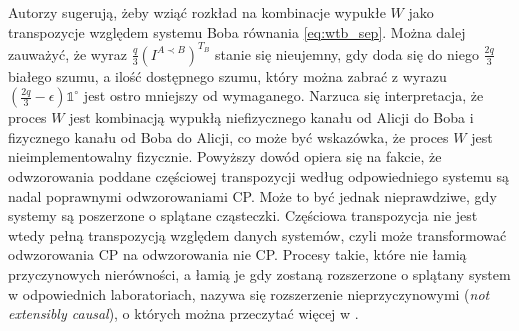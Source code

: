 \documentclass[10pt]{article} %
\newcommand{\IO}{\mathbb{1}^\circ}
\begin{document}
Autorzy \cite{causal_model} sugerują, żeby wziąć rozkład na kombinacje wypukłe $W$ jako transpozycje względem systemu Boba równania \eqref{eq:wtb_sep}. Można dalej zauważyć, że wyraz $\frac{q}{3} \left( I^{A \prec B} \right)^{T_B}$ stanie się nieujemny, gdy doda się do niego $\frac{2q}{3}$ białego szumu,
a ilość dostępnego szumu, który można zabrać z wyrazu $\left( \frac{2q}{3} - \epsilon \right) \IO$ jest ostro mniejszy od wymaganego. Narzuca się interpretacja, że proces $W$ jest kombinacją wypukłą niefizycznego kanału od Alicji do Boba i fizycznego kanału od Boba do Alicji, co może być wskazówka, że proces
$W$ jest nieimplementowalny fizycznie.
Powyższy dowód opiera się na fakcie, że odwzorowania poddane częściowej transpozycji według odpowiedniego systemu są nadal poprawnymi odwzorowaniami CP.
Może to być jednak nieprawdziwe, gdy systemy są poszerzone o splątane cząsteczki. Częściowa transpozycja nie jest wtedy pełną transpozycją względem danych systemów, czyli może transformować odwzorowania CP na odwzorowania nie CP. Procesy takie, które nie łamią przyczynowych nierówności, a łamią je gdy zostaną rozszerzone o splątany system w odpowiednich laboratoriach, nazywa się rozszerzenie nieprzyczynowymi (\textit{not extensibly causal}),
o których można przeczytać więcej w \cite{causal_model}.
\end{document}
